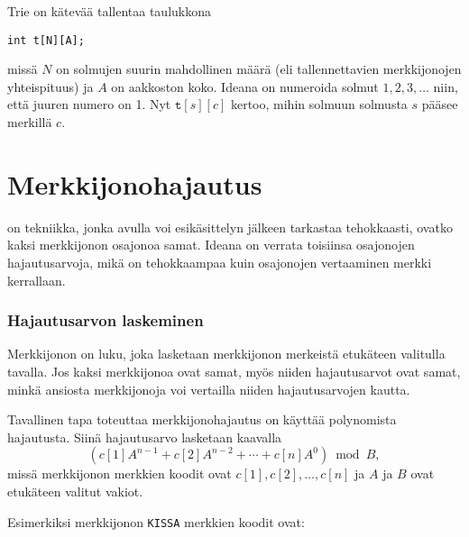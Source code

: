Trie on kätevää tallentaa taulukkona
\begin{lstlisting}
int t[N][A];
\end{lstlisting}
missä $N$ on solmujen suurin mahdollinen määrä
(eli tallennettavien merkkijonojen yhteispituus)
ja $A$ on aakkoston koko.
Ideana on numeroida solmut $1,2,3,\ldots$ niin,
että juuren numero on 1.
Nyt $\texttt{t}[s][c]$ kertoo,
mihin solmuun solmusta $s$ pääsee merkillä $c$.

\section{Merkkijonohajautus}


on tekniikka, jonka avulla voi esikäsittelyn
jälkeen tarkastaa tehokkaasti, ovatko
kaksi merkkijonon osajonoa samat.
Ideana on verrata toisiinsa
osajonojen hajautusarvoja,
mikä on tehokkaampaa kuin osajonojen
vertaaminen merkki kerrallaan.

\subsubsection*{Hajautusarvon laskeminen}


Merkkijonon 
on luku, joka lasketaan merkkijonon merkeistä
etukäteen valitulla tavalla.
Jos kaksi merkkijonoa ovat samat,
myös niiden hajautusarvot ovat samat,
minkä ansiosta merkkijonoja voi vertailla
niiden hajautusarvojen kautta.

Tavallinen tapa toteuttaa merkkijonohajautus
on käyttää polynomista hajautusta.
Siinä hajautusarvo lasketaan kaavalla
\[(c[1] A^{n-1} + c[2] A^{n-2} + \cdots + c[n] A^0) \bmod B  ,\]
missä merkkijonon merkkien koodit ovat
$c[1],c[2],\ldots,c[n]$ ja $A$ ja $B$ ovat etukäteen
valitut vakiot.

Esimerkiksi merkkijonon \texttt{KISSA} merkkien koodit ovat:
\begin{center}
\end{center}

